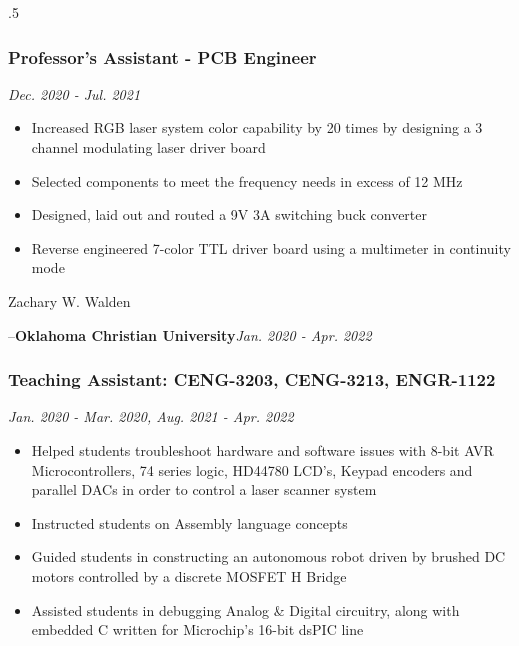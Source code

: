 \documentclass{article}
\newcommand{\companyHeader}[2]{--\large{\bfseries{#1}}\hfill \small{\textsl{#2}}}
\begin{document}
\begin{spacing}{.5}
{		\subsubsection{\large{Professor's Assistant - PCB Engineer}} \hfill \small{\textsl{Dec. 2020 - Jul. 2021}}
			\begin{itemize}[label=--,itemsep=-.35ex]
				\item \large{Increased RGB laser system color capability by 20 times by designing a 3 channel modulating laser driver board}
				\item \large{Selected components to meet the frequency needs in excess of 12 MHz}
				\item \large{Designed, laid out and routed a 9V 3A switching buck converter}
				\item \large{Reverse engineered 7-color TTL driver board using a multimeter in continuity mode}
			\end{itemize}
\newpage

\begin{center}
	\begin{huge}
		Zachary W. Walden\\
	\end{huge}
\end{center}

	\companyHeader{Oklahoma Christian University}{Jan. 2020 - Apr. 2022}
		\subsubsection{\large{Teaching Assistant: CENG-3203, CENG-3213, ENGR-1122}} \hfill \small{\textsl{Jan. 2020 - Mar. 2020, Aug. 2021 - Apr. 2022}}
			\begin{itemize}[label=--,itemsep=-.35ex]
				\item \large{Helped students troubleshoot hardware and software issues with 8-bit AVR Microcontrollers, 74 series logic, HD44780 LCD's, Keypad encoders and parallel DACs in order to control a laser scanner system}
				\item \large{Instructed students on Assembly language concepts}
				\item \large{Guided students in constructing an autonomous robot driven by brushed DC motors controlled by a discrete MOSFET H Bridge}
				\item \large{Assisted students in debugging Analog \& Digital circuitry, along with embedded C written for Microchip's 16-bit dsPIC line}
			\end{itemize}


}
\end{spacing}
\end{document}

